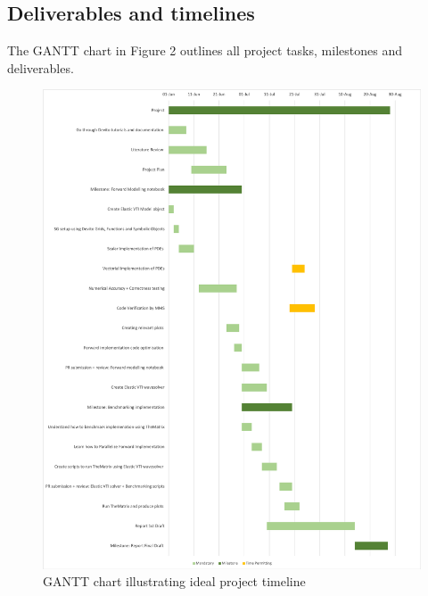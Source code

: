 \subsection{Deliverables and timelines}
The GANTT chart in Figure 2 outlines all project tasks, milestones and deliverables.
\begin{figure}[h!]
    \centering
    \includegraphics[width=1.0\textwidth]{project/Project_GANTT_Chart.png}
    \caption{GANTT chart illustrating ideal project timeline}
    \label{fig:imperial-picture}
\end{figure}

\newpage
